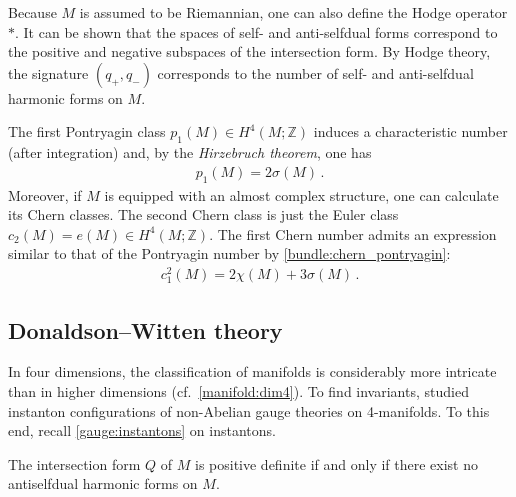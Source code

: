     Because $M$ is assumed to be Riemannian, one can also define the Hodge operator $\ast$. It can be shown that the spaces of self- and anti-selfdual forms correspond to the positive and negative subspaces of the intersection form. By Hodge theory, the signature $(q_+,q_-)$ corresponds to the number of self- and anti-selfdual harmonic forms on $M$.

    The first Pontryagin class $p_1(M)\in H^4(M;\mathbb{Z})$ induces a characteristic number (after integration) and, by the \textit{Hirzebruch theorem}, one has
    \begin{gather}
        p_1(M) = 2\sigma(M)\,.
    \end{gather}
    Moreover, if $M$ is equipped with an almost complex structure, one can calculate its Chern classes. The second Chern class is just the Euler class $c_2(M)=e(M)\in H^4(M;\mathbb{Z})$. The first Chern number admits an expression similar to that of the Pontryagin number by \cref{bundle:chern_pontryagin}:
    \begin{gather}
        c^2_1(M) = 2\chi(M) + 3\sigma(M)\,.
    \end{gather}

\subsection{Donaldson--Witten theory}

    In four dimensions, the classification of manifolds is considerably more intricate than in higher dimensions (cf.~\cref{manifold:dim4}). To find invariants,  studied instanton configurations of non-Abelian gauge theories on 4-manifolds. To this end, recall \cref{gauge:instantons} on instantons.

    \begin{property}
        The intersection form $Q$ of $M$ is positive definite if and only if there exist no antiselfdual harmonic forms on $M$.
    \end{property}

